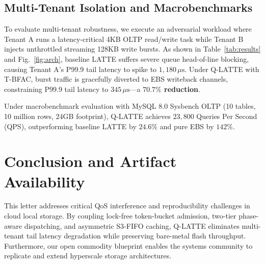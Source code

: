 \documentclass[lettersize,journal]{IEEEtran}
\begin{document}
\begin{table}[t]
\centering
\caption{Consolidated Performance and Cost Evaluation Matrix}
\label{tab:results}
\end{table}

\subsection{Multi-Tenant Isolation and Macrobenchmarks}
To evaluate multi-tenant robustness, we execute an adversarial workload where Tenant A runs a latency-critical 4KB OLTP read/write task while Tenant B injects unthrottled streaming 128KB write bursts.
As shown in Table~\ref{tab:results} and Fig.~\ref{fig:arch}, baseline LATTE suffers severe queue head-of-line blocking, causing Tenant A's P99.9 tail latency to spike to $1,180\,\mu\text{s}$. Under Q-LATTE with T-BFAC, burst traffic is gracefully diverted to EBS writeback channels, constraining P99.9 tail latency to $345\,\mu\text{s}$—a \textbf{$70.7\%$ reduction}.

Under macrobenchmark evaluation with MySQL 8.0 Sysbench OLTP (10 tables, 10 million rows, 24GB footprint), Q-LATTE achieves $23,800$ Queries Per Second (QPS), outperforming baseline LATTE by $24.6\%$ and pure EBS by $142\%$.

\section{Conclusion and Artifact Availability}
This letter addresses critical QoS interference and reproducibility challenges in cloud local storage. By coupling lock-free token-bucket admission, two-tier phase-aware dispatching, and asymmetric S3-FIFO caching, Q-LATTE eliminates multi-tenant tail latency degradation while preserving bare-metal flash throughput. Furthermore, our open commodity blueprint enables the systems community to replicate and extend hyperscale storage architectures. 
\end{document}
